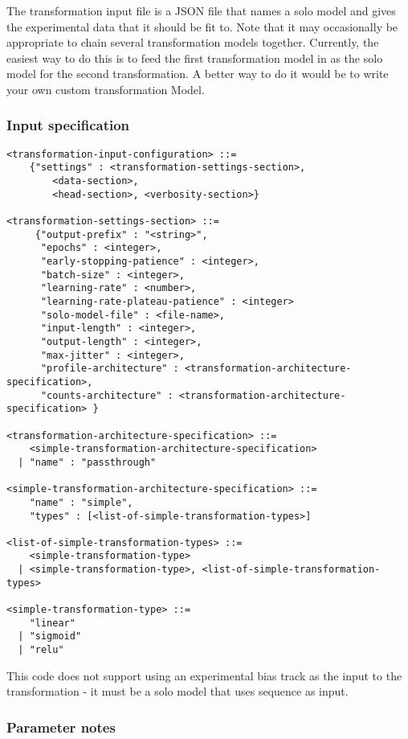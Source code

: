 \documentclass{article}
\begin{document}
The transformation input file is a JSON file that names a solo model and gives the experimental data that it should be fit to.
Note that it may occasionally be appropriate to chain several transformation models together.
Currently, the easiest way to do this is to feed the first transformation model in as the solo model
for the second transformation. A better way to do it would be to write your own custom transformation Model.

\subsubsection{Input specification}
\begin{lstlisting}
<transformation-input-configuration> ::=
    {"settings" : <transformation-settings-section>,
        <data-section>,
        <head-section>, <verbosity-section>}

<transformation-settings-section> ::=
     {"output-prefix" : "<string>",
      "epochs" : <integer>,
      "early-stopping-patience" : <integer>,
      "batch-size" : <integer>,
      "learning-rate" : <number>,
      "learning-rate-plateau-patience" : <integer>
      "solo-model-file" : <file-name>,
      "input-length" : <integer>,
      "output-length" : <integer>,
      "max-jitter" : <integer>,
      "profile-architecture" : <transformation-architecture-specification>,
      "counts-architecture" : <transformation-architecture-specification> }

<transformation-architecture-specification> ::=
    <simple-transformation-architecture-specification>
  | "name" : "passthrough"

<simple-transformation-architecture-specification> ::=
    "name" : "simple",
    "types" : [<list-of-simple-transformation-types>]

<list-of-simple-transformation-types> ::=
    <simple-transformation-type>
  | <simple-transformation-type>, <list-of-simple-transformation-types>

<simple-transformation-type> ::=
    "linear"
  | "sigmoid"
  | "relu"

\end{lstlisting}

This code does not support using an experimental bias track as the input to the
transformation - it must be a solo model that uses sequence as input.

\subsubsection{Parameter notes}
\end{document}
